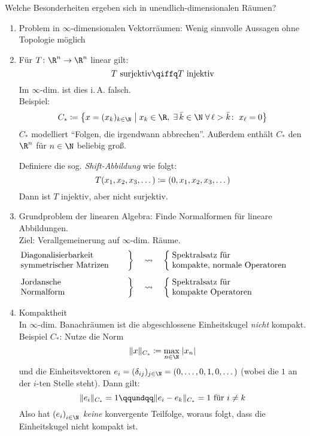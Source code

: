 \begin{thEmpty}
    Welche Besonderheiten ergeben sich in unendlich-dimensionalen Räumen?
    \begin{enumerate}[(1)]
        \item
            Problem in $\infty$-dimensionalen Vektorräumen:
            Wenig sinnvolle Aussagen ohne Topologie möglich
        \item
            Für $T\colon\R^n\to\R^n$ linear gilt:
            \[ T\text{ surjektiv} \qiffq T\text{ injektiv} \]
            Im $\infty$-dim. ist dies i.\,A. falsch.\\
            Beispiel:
            \[ C_\ast \defeq \left\{ 
                x=(x_k)_{k\in\N} \Mid x_k\in\R,\; \exists\,\bar k\in\N\;
                \forall\, \ell>\bar k\colon\; x_\ell = 0
            \right\}
        \]
        $C_\ast$ modelliert \enquote{Folgen, die irgendwann abbrechen}.
        Außerdem enthält $C_\ast$ den $\R^n$ für $n\in\N$ beliebig groß.

        Definiere die sog. \emph{Shift-Abbildung} wie folgt:
        \[ T(x_1,x_2,x_3,\dots) \coloneqq (0,x_1,x_2,x_3,\dots) \]
        Dann ist $T$ injektiv, aber nicht surjektiv.

    \item
        Grundproblem der linearen Algebra: Finde Normalformen für lineare
        Abbildungen.\\
        Ziel: Verallgemeinerung auf $\infty$-dim. Räume.
        \begin{align*}
            \left. \parbox{4.5cm}{Diagonalisierbarkeit\\symmetrischer Matrizen}
            \right\} &\quad\rightsquigarrow\quad
            \left\{\; \parbox{6cm}{Spektralsatz für\\kompakte, normale Operatoren}
            \right.
            \\[1ex]
            \left. \parbox{4.5cm}{Jordansche\\Normalform\vphantom{y}}
            \right\} &\quad\rightsquigarrow\quad
            \left\{\; \parbox{6cm}{Spektralsatz für\\kompakte Operatoren}
            \right.
        \end{align*}

    \item
        Kompaktheit\\
        In $\infty$-dim. Banachräumen ist die abgeschlossene Einheitskugel
        \emph{nicht} kompakt.\\
        Beispiel $C_\ast$: Nutze die Norm
        \[ \norm{x}_{C_\ast} \defeq \max_{n\in\N} \;\abs{x_n} \]
        und die Einheitsvektoren $e_i = (\kron{ij})_{j\in\N} =
        (0,\dots,0,1,0,\dots)$ (wobei die $1$ an der $i$-ten Stelle steht).
        Dann gilt:
        \[ \norm{e_i}_{C_\ast} = 1 \qqundqq \norm{e_i-e_k}_{C_\ast} = 1 \text{
        für $i\neq k$}
        \]
        Also hat $\iSeq e$ \emph{keine} konvergente Teilfolge, woraus folgt,
        dass die Einheitskugel nicht kompakt ist.


\end{enumerate}
\end{thEmpty}
